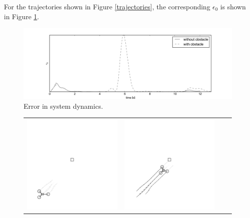 \documentclass[letterpaper, 10 pt, conference]{ieeeconf}
\begin{document}
For the trajectories shown in Figure \ref{trajectories}, the corresponding $\epsilon_{0}$ is shown in Figure \ref{error}.
\begin{figure}[H]
	\centering
	\includegraphics[scale=0.3]{figures/epsilons.pdf}
	\caption{Error in system dynamics.}
	\label{error}
\end{figure}
\indent
\begin{figure}[t]
	\centering
	\setlength{\tabcolsep}{0.1em}
	\begin{tabular}[t]{|c|c|c|c|}
			\hline
				\includegraphics[scale=0.65]{figures/obstacle_0_tikz_gray.pdf} &
				\includegraphics[scale=0.65]{figures/obstacle_1_tikz_gray.pdf} &

\end{tabular}
\end{figure}
\end{document}
